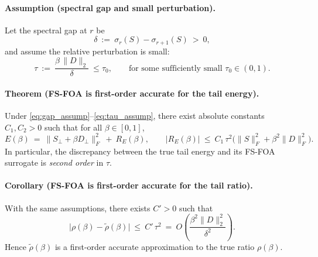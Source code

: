 \paragraph{Assumption (spectral gap and small perturbation).}
Let the spectral gap at $r$ be
\begin{equation}\label{eq:gap_assump}
\delta\ :=\ \sigma_r(S)-\sigma_{r+1}(S)\ >\ 0,
\end{equation}
and assume the relative perturbation is small:
\begin{equation}\label{eq:tau_assump}
\tau\ :=\ \frac{\beta\,\|D\|_2}{\delta}\ \le\tau_0, \qquad \text{for some sufficiently small }\tau_0\in(0,1).
\end{equation}

\paragraph{Theorem (FS-FOA is first-order accurate for the tail energy).}
Under \eqref{eq:gap_assump}--\eqref{eq:tau_assump}, there exist absolute constants $C_1,C_2>0$ such that for all $\beta\in[0,1]$,
\begin{equation}\label{eq:fsfoa_main_bound}
E(\beta)\ =\ \|S_\perp+\beta D_\perp\|_F^2\ +\ R_E(\beta),
\qquad
\big|R_E(\beta)\big|\ \le\ C_1\,\tau^2\Big(\|S\|_F^2+\beta^2\|D\|_F^2\Big).
\end{equation}
In particular, the discrepancy between the true tail energy and its FS-FOA surrogate is \emph{second order} in $\tau$.

\paragraph{Corollary (FS-FOA is first-order accurate for the tail ratio).}
With the same assumptions, there exists $C'>0$ such that
\begin{equation}\label{eq:ratio_bound}
\big|\rho(\beta)-\widetilde\rho(\beta)\big|\ \le\ C'\,\tau^2
\ =\ O\!\left(\frac{\beta^2\|D\|_2^2}{\delta^2}\right).
\end{equation}
Hence $\widetilde\rho(\beta)$ is a first-order accurate approximation to the true ratio $\rho(\beta)$.


